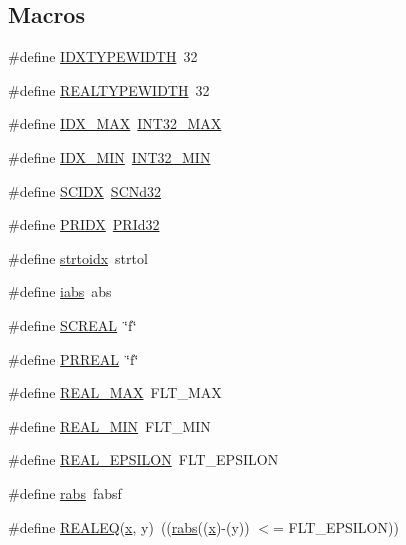 \subsection*{Macros}
\begin{DoxyCompactItemize}
\item 
\#define \hyperlink{a00879_a211f5ff056a3870830eba32e6175c630}{I\+D\+X\+T\+Y\+P\+E\+W\+I\+D\+TH}~32
\item 
\#define \hyperlink{a00879_a0ffc9bd00d2a4943cb50d3adda94572a}{R\+E\+A\+L\+T\+Y\+P\+E\+W\+I\+D\+TH}~32
\item 
\#define \hyperlink{a00879_a45ec4ebc9cf3a56a496d1de33fdfd7c5}{I\+D\+X\+\_\+\+M\+AX}~\hyperlink{a00119_a181807730d4a375f848ba139813ce04f}{I\+N\+T32\+\_\+\+M\+AX}
\item 
\#define \hyperlink{a00879_a32a0bbbc935a66ae4a7cd06fc713d7f7}{I\+D\+X\+\_\+\+M\+IN}~\hyperlink{a00119_a688eb21a22db27c2b2bd5836943cdcbe}{I\+N\+T32\+\_\+\+M\+IN}
\item 
\#define \hyperlink{a00879_adec60e20e666e66ea362e93a8ca31524}{S\+C\+I\+DX}~\hyperlink{a00113_a2b7ab77ff6ede9c3c285b714496f77e2}{S\+C\+Nd32}
\item 
\#define \hyperlink{a00879_a46c4476f96c9a5fa754b9bc3be195a07}{P\+R\+I\+DX}~\hyperlink{a00113_a6d94d1417e1b35c53aee6306590de72b}{P\+R\+Id32}
\item 
\#define \hyperlink{a00879_a5a893315b214da705dd29046c4386c51}{strtoidx}~strtol
\item 
\#define \hyperlink{a00879_a4e78ddb52240687b065c7889e7ab5b99}{iabs}~abs
\item 
\#define \hyperlink{a00879_a4c4ca7a08427aa7cb157da01c8ed3f0d}{S\+C\+R\+E\+AL}~\char`\"{}f\char`\"{}
\item 
\#define \hyperlink{a00879_af3160ddf57c3a9517f163ea5bc869b64}{P\+R\+R\+E\+AL}~\char`\"{}f\char`\"{}
\item 
\#define \hyperlink{a00879_a70fc4e60483cc1a5cb39dd935640cadc}{R\+E\+A\+L\+\_\+\+M\+AX}~F\+L\+T\+\_\+\+M\+AX
\item 
\#define \hyperlink{a00879_ae19c49417e2720027ed571edc915b5f2}{R\+E\+A\+L\+\_\+\+M\+IN}~F\+L\+T\+\_\+\+M\+IN
\item 
\#define \hyperlink{a00879_a268bd688a4b5c8bb1c12bfdb92e27a1d}{R\+E\+A\+L\+\_\+\+E\+P\+S\+I\+L\+ON}~F\+L\+T\+\_\+\+E\+P\+S\+I\+L\+ON
\item 
\#define \hyperlink{a00879_a5f027fb1242f417e1631cc5e1c67ce0d}{rabs}~fabsf
\item 
\#define \hyperlink{a00879_af7ffa47809b85f79ddc368e67705d5b3}{R\+E\+A\+L\+EQ}(\hyperlink{a00605_ac98c3bb25378222646e977292011625f}{x},  y)~((\hyperlink{a00879_a5f027fb1242f417e1631cc5e1c67ce0d}{rabs}((\hyperlink{a00605_ac98c3bb25378222646e977292011625f}{x})-\/(y)) $<$= F\+L\+T\+\_\+\+E\+P\+S\+I\+L\+ON))

\end{DoxyCompactItemize}
